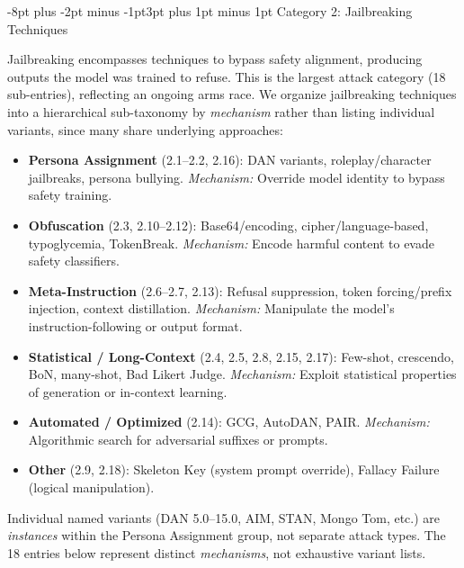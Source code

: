 \documentclass[conference]{IEEEtran}
\makeatletter
\renewcommand{\subsection}{\@startsection{subsection}{2}{\z@}%
  {-8pt plus -2pt minus -1pt}{3pt plus 1pt minus 1pt}%
  {\normalfont\normalsize\bfseries\sffamily\color{accentblue}}}
\makeatother
\begin{document}
\subsection{Category 2: Jailbreaking Techniques}

Jailbreaking encompasses techniques to bypass safety alignment, producing outputs the model was trained to refuse. This is the largest attack category (18 sub-entries), reflecting an ongoing arms race. We organize jailbreaking techniques into a hierarchical sub-taxonomy by \emph{mechanism} rather than listing individual variants, since many share underlying approaches:

\begin{tcolorbox}[keyfinding, title={Jailbreaking Sub-Taxonomy by Mechanism}]
\begin{itemize}[leftmargin=*, nosep]
\item \textbf{Persona Assignment} (2.1--2.2, 2.16): DAN variants, roleplay/character jailbreaks, persona bullying. \textit{Mechanism:} Override model identity to bypass safety training.
\item \textbf{Obfuscation} (2.3, 2.10--2.12): Base64/encoding, cipher/language-based, typoglycemia, TokenBreak. \textit{Mechanism:} Encode harmful content to evade safety classifiers.
\item \textbf{Meta-Instruction} (2.6--2.7, 2.13): Refusal suppression, token forcing/prefix injection, context distillation. \textit{Mechanism:} Manipulate the model's instruction-following or output format.
\item \textbf{Statistical / Long-Context} (2.4, 2.5, 2.8, 2.15, 2.17): Few-shot, crescendo, BoN, many-shot, Bad Likert Judge. \textit{Mechanism:} Exploit statistical properties of generation or in-context learning.
\item \textbf{Automated / Optimized} (2.14): GCG, AutoDAN, PAIR. \textit{Mechanism:} Algorithmic search for adversarial suffixes or prompts.
\item \textbf{Other} (2.9, 2.18): Skeleton Key (system prompt override), Fallacy Failure (logical manipulation).
\end{itemize}
Individual named variants (DAN 5.0--15.0, AIM, STAN, Mongo Tom, etc.) are \emph{instances} within the Persona Assignment group, not separate attack types. The 18 entries below represent distinct \emph{mechanisms}, not exhaustive variant lists.
\end{tcolorbox}
\end{document}
